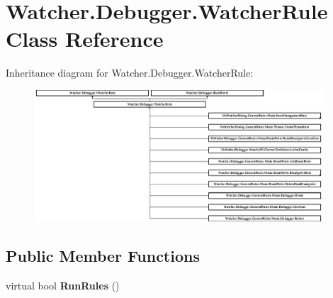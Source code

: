 \hypertarget{class_watcher_1_1_debugger_1_1_watcher_rule}{\section{Watcher.\+Debugger.\+Watcher\+Rule Class Reference}
\label{class_watcher_1_1_debugger_1_1_watcher_rule}
}
Inheritance diagram for Watcher.\+Debugger.\+Watcher\+Rule\+:\begin{figure}[H]
\begin{center}
\leavevmode
\includegraphics[height=4.890830cm]{class_watcher_1_1_debugger_1_1_watcher_rule}
\end{center}
\end{figure}
\subsection*{Public Member Functions}
\begin{DoxyCompactItemize}
\item 
\hypertarget{class_watcher_1_1_debugger_1_1_watcher_rule_a7eb453c5b2275a6de5ce0c1f9d039d23}{virtual bool {\bfseries Run\+Rules} ()}\label{class_watcher_1_1_debugger_1_1_watcher_rule_a7eb453c5b2275a6de5ce0c1f9d039d23}

\end{DoxyCompactItemize}
